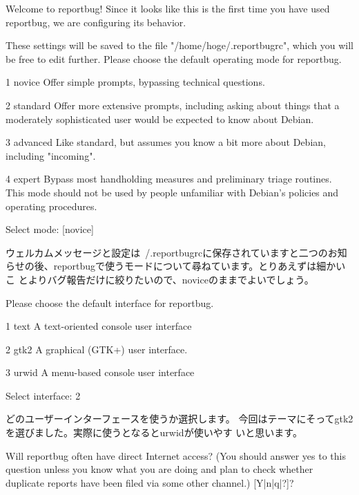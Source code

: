 \documentclass[mingoth,a4paper]{jsarticle}
\begin{document}
\begin{commandline}
Welcome to reportbug! Since it looks like this is the first time you have used reportbug, we are configuring its behavior.

These settings will be saved to the file "/home/hoge/.reportbugrc", which you will be free to edit further.                
Please choose the default operating mode for reportbug.                                                                   

1 novice    Offer simple prompts, bypassing technical questions.

2 standard  Offer more extensive prompts, including asking about things that a moderately sophisticated user would be
            expected to know about Debian.                                                                           

3 advanced  Like standard, but assumes you know a bit more about Debian, including "incoming".

4 expert    Bypass most handholding measures and preliminary triage routines. This mode should not be used by people
            unfamiliar with Debian's policies and operating procedures.                                             

Select mode: [novice] 
\end{commandline}

ウェルカムメッセージと設定は~/.reportbugrcに保存されていますと二つのお知
らせの後、reportbugで使うモードについて尋ねています。とりあえずは細かいこ
とよりバグ報告だけに絞りたいので、noviceのままでよいでしょう。

\newpage

\begin{commandline}
Please choose the default interface for reportbug.

1 text   A text-oriented console user interface

2 gtk2   A graphical (GTK+) user interface.

3 urwid  A menu-based console user interface

Select interface: 2
\end{commandline}

どのユーザーインターフェースを使うか選択します。
今回はテーマにそってgtk2を選びました。実際に使うとなるとurwidが使いやす
いと思います。

\begin{commandline}
Will reportbug often have direct Internet access? (You should answer yes to this question unless you know what you are doing
and plan to check whether duplicate reports have been filed via some other channel.) [Y|n|q|?]?
\end{commandline}
\end{document}
